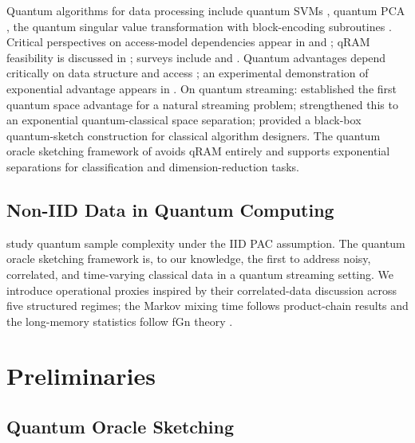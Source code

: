\documentclass[sensors,article,submit,pdftex,moreauthors]{Definitions/mdpi}
\begin{document}
Quantum algorithms for data processing include quantum SVMs \citep{rebentrost2014quantum}, quantum PCA \citep{lloyd2014quantum}, the quantum singular value transformation \citep{gilyen2019qsvt} with block-encoding subroutines \citep{chakraborty2019blockencodings}. Critical perspectives on access-model dependencies appear in \citet{aaronson2015readthefineprint} and \citet{tang2019quantum}; qRAM feasibility is discussed in \citet{giovannetti2008quantum}; surveys include \citet{chen2024qmlsurvey} and \citet{schuld2018supervised}. Quantum advantages depend critically on data structure and access \citep{huang2021powerofdata}; an experimental demonstration of exponential advantage appears in \citet{huang2022experiments}. On quantum streaming: \citet{kallaugher2021streaming} established the first quantum space advantage for a natural streaming problem; \citet{kallaugher2024maxdicut} strengthened this to an exponential quantum-classical space separation; \citet{kallaugher2025designquantum} provided a black-box quantum-sketch construction for classical algorithm designers. The quantum oracle sketching framework of \citet{zhao2026exponential} avoids qRAM entirely and supports exponential separations for classification and dimension-reduction tasks.

\subsection{Non-IID Data in Quantum Computing}

\citet{arunachalam2018optimal} study quantum sample complexity under the IID PAC assumption. The quantum oracle sketching framework \citep{zhao2026exponential} is, to our knowledge, the first to address noisy, correlated, and time-varying classical data in a quantum streaming setting. We introduce operational proxies inspired by their correlated-data discussion across five structured regimes; the Markov mixing time follows product-chain results \citep{levin2017mixing} and the long-memory statistics follow fGn theory \citep{mandelbrot1968fbm, beran1994statistics}.


\section{Preliminaries}
\label{sec:prelim}

\subsection{Quantum Oracle Sketching}
\end{document}
